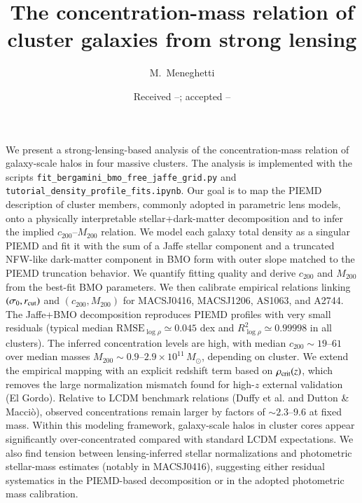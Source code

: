 \documentclass{aa}
\begin{document}
\title{The concentration-mass relation of cluster galaxies from strong lensing}

\author{M.~Meneghetti}


\date{Received --; accepted --}

\abstract
{We present a strong-lensing-based analysis of the concentration-mass relation of galaxy-scale halos in four massive clusters. The analysis is implemented with the scripts \texttt{fit\_bergamini\_bmo\_free\_jaffe\_grid.py} and \texttt{tutorial\_density\_profile\_fits.ipynb}.}
{Our goal is to map the PIEMD description of cluster members, commonly adopted in parametric lens models, onto a physically interpretable stellar+dark-matter decomposition and to infer the implied $c_{200}$--$M_{200}$ relation.}
{We model each galaxy total density as a singular PIEMD and fit it with the sum of a Jaffe stellar component and a truncated NFW-like dark-matter component in BMO form with outer slope matched to the PIEMD truncation behavior. We quantify fitting quality and derive $c_{200}$ and $M_{200}$ from the best-fit BMO parameters. We then calibrate empirical relations linking $(\sigma_0,r_{\rm cut})$ and $(c_{200},M_{200})$ for MACSJ0416, MACSJ1206, AS1063, and A2744.}
{The Jaffe+BMO decomposition reproduces PIEMD profiles with very small residuals (typical median $\mathrm{RMSE}_{\log\rho}\simeq 0.045$ dex and $R^2_{\log\rho}\simeq0.99998$ in all clusters). The inferred concentration levels are high, with median $c_{200}\sim 19$--$61$ over median masses $M_{200}\sim 0.9$--$2.9\times10^{11}\,M_\odot$, depending on cluster. We extend the empirical mapping with an explicit redshift term based on $\rho_{\rm crit}(z)$, which removes the large normalization mismatch found for high-$z$ external validation (El Gordo). Relative to LCDM benchmark relations (Duffy et al. and Dutton \& Macci\`o), observed concentrations remain larger by factors of $\sim2.3$--$9.6$ at fixed mass.}
{Within this modeling framework, galaxy-scale halos in cluster cores appear significantly over-concentrated compared with standard LCDM expectations. We also find tension between lensing-inferred stellar normalizations and photometric stellar-mass estimates (notably in MACSJ0416), suggesting either residual systematics in the PIEMD-based decomposition or in the adopted photometric mass calibration.}

\end{document}
